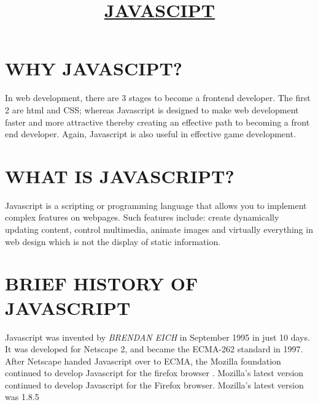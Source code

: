 \documentclass[50pt]{article}
\begin{document}
	\title{\underline{\textbf{JAVASCIPT}}}
	\maketitle
	\section{WHY JAVASCIPT?}
	In web development, there are 3 stages to become a frontend developer. The first 2 are html and CSS; whereas Javascript is designed to make web development faster and more attractive thereby creating an effective path to becoming a front end developer. Again, Javascript is also useful in effective game development.
	\section{WHAT IS JAVASCRIPT?}
	Javascript is a scripting or programming language that allows you to implement complex features on webpages. Such features include: create dynamically updating content, control multimedia, animate images and virtually everything in web design which is not the display of static information.
	\section{BRIEF HISTORY OF JAVASCRIPT}
	Javascript was invented by \emph{BRENDAN EICH} in September 1995 in just 10 days. It was developed for Netscape 2, and became the ECMA-262 standard in 1997. After Netscape handed Javascript over to ECMA, the Mozilla foundation continued to develop Javascript for the firefox browser . Mozilla's latest version continued to develop Javascript for the Firefox  browser. Mozilla's latest version was 1.8.5
\end{document}
